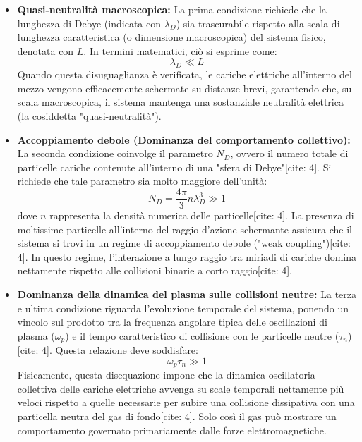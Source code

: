 \begin{itemize}
\item \textbf{Quasi-neutralità macroscopica:} La prima condizione richiede che la lunghezza di Debye (indicata con $\lambda_D$) sia trascurabile rispetto alla scala di lunghezza caratteristica (o dimensione macroscopica) del sistema fisico, denotata con $L$. In termini matematici, ciò si esprime come:
\begin{equation}
\lambda_D \ll L
\end{equation}
Quando questa disuguaglianza è verificata, le cariche elettriche all'interno del mezzo vengono efficacemente schermate su distanze brevi, garantendo che, su scala macroscopica, il sistema mantenga una sostanziale neutralità elettrica (la cosiddetta "quasi-neutralità").


\item \textbf{Accoppiamento debole (Dominanza del comportamento collettivo):} La seconda condizione coinvolge il parametro $N_D$, ovvero il numero totale di particelle cariche contenute all'interno di una "sfera di Debye"[cite: 4]. Si richiede che tale parametro sia molto maggiore dell'unità:
\begin{equation}
    N_D = \frac{4\pi}{3}n\lambda_D^3 \gg 1
\end{equation}
dove $n$ rappresenta la densità numerica delle particelle[cite: 4]. La presenza di moltissime particelle all'interno del raggio d'azione schermante assicura che il sistema si trovi in un regime di accoppiamento debole ("weak coupling")[cite: 4]. In questo regime, l'interazione a lungo raggio tra miriadi di cariche domina nettamente rispetto alle collisioni binarie a corto raggio[cite: 4].

\item \textbf{Dominanza della dinamica del plasma sulle collisioni neutre:} La terza e ultima condizione riguarda l'evoluzione temporale del sistema, ponendo un vincolo sul prodotto tra la frequenza angolare tipica delle oscillazioni di plasma ($\omega_p$) e il tempo caratteristico di collisione con le particelle neutre ($\tau_n$)[cite: 4]. Questa relazione deve soddisfare:
\begin{equation}
    \omega_p \tau_n \gg 1
\end{equation}
Fisicamente, questa disequazione impone che la dinamica oscillatoria collettiva delle cariche elettriche avvenga su scale temporali nettamente più veloci rispetto a quelle necessarie per subire una collisione dissipativa con una particella neutra del gas di fondo[cite: 4]. Solo così il gas può mostrare un comportamento governato primariamente dalle forze elettromagnetiche.

\end{itemize}


